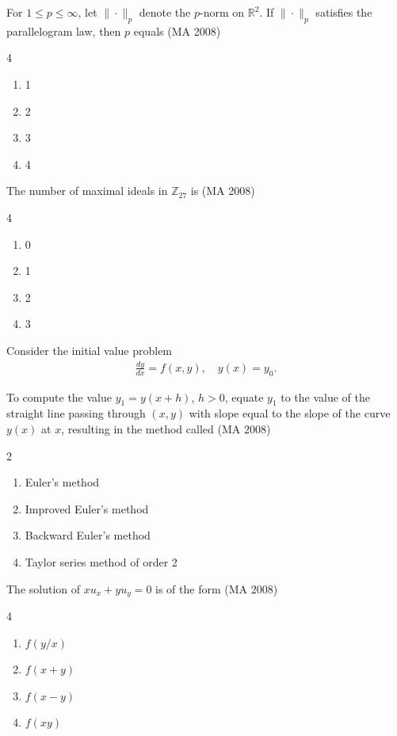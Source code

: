 



\item For \(1 \leq p \leq \infty\), let \(\|\cdot\|_p\) denote the \(p\)-norm on \(\mathbb{R}^2\). If \(\|\cdot\|_p\) satisfies the parallelogram law, then \(p\) equals
\hfill (MA 2008)
\begin{multicols}{4}
\begin{enumerate}
\item 1
\item 2
\item 3
\item 4
\end{enumerate}
\end{multicols}

\item The number of maximal ideals in \(\mathbb{Z}_{27}\) is
\hfill (MA 2008)
\begin{multicols}{4}
\begin{enumerate}
\item 0
\item 1
\item 2
\item 3
\end{enumerate}
\end{multicols}

\item Consider the initial value problem
\begin{align}
    \frac{dy}{dx} = f(x,y), \quad y(x) = y_0.
\end{align}


To compute the value \(y_1 = y(x+h)\), \(h>0\), equate \(y_1\) to the value of the straight line passing through \((x,y)\) with slope equal to the slope of the curve \(y(x)\) at \(x\), resulting in the method called
\hfill (MA 2008)
\begin{multicols}{2}
\begin{enumerate}
\item Euler's method
\item Improved Euler's method
\item Backward Euler's method
\item Taylor series method of order 2
\end{enumerate}
\end{multicols}



\item The solution of \(x u_x + y u_y = 0\) is of the form
\hfill (MA 2008)
\begin{multicols}{4}
\begin{enumerate}
\item \(f(y/x)\)
\item \(f(x+y)\)
\item \(f(x - y)\)
\item \(f(x y)\)
\end{enumerate}
\end{multicols}

